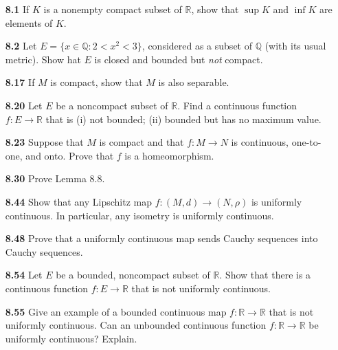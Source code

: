 \documentclass[12pt]{amsart}
\def\QQ{{\mathbb Q}}
\def\RR{{\mathbb R}}
\begin{document}
\begin{enumerate}

\item[\bf 8.1] If $K$ is a nonempty compact subset of $\RR$, show that $\sup K$ and $\inf K$ are elements of $K$.

\bigskip

\item[\bf 8.2] Let $E=\{x\in\QQ : 2<x^2<3\}$, considered as a subset of $\QQ$ (with its usual metric). Show hat $E$ is closed and bounded but \textit{not} compact. 

\bigskip

\item[\bf 8.17] If $M$ is compact, show that $M$ is also separable. 

\bigskip

\item[\bf 8.20] Let $E$ be a noncompact subset of $\RR$. Find a continuous function $f:E\to\RR$ that is (i) not bounded; (ii) bounded but has no maximum value. 

\bigskip

\item[\bf 8.23] Suppose that $M$ is compact and that $f:M\to N$ is continuous, one-to-one, and onto. Prove that $f$ is a homeomorphism. 

\bigskip

\item[\bf 8.30] Prove Lemma 8.8.

\bigskip

\item[\bf 8.44] Show that any Lipschitz map $f:(M,d)\to (N,\rho)$ is uniformly continuous. In particular, any isometry is uniformly continuous. 

\bigskip

\item[\bf 8.48] Prove that a uniformly continuous map sends Cauchy sequences into Cauchy sequences. 

\bigskip

\item[\bf 8.54] Let $E$ be a bounded, noncompact subset of $\RR$. Show that there is a continuous function $f:E\to\RR$ that is not uniformly continuous. 

\bigskip

\item[\bf 8.55] Give an example of a bounded continuous map $f:\RR\to\RR$ that is not uniformly continuous. Can an unbounded continuous function $f:\RR\to\RR$ be uniformly continuous? Explain.


\end{enumerate}
\end{document}
